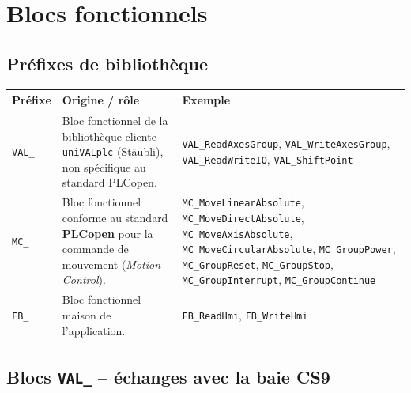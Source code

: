 \section{Blocs fonctionnels}
\label{secBlocsFonctionnels}

\subsection{Préfixes de bibliothèque}

\begin{center}
    \begin{tabular}{|p{2.6cm}|p{6.6cm}|p{5cm}|}
        \hline
        \textbf{Préfixe} & \textbf{Origine / rôle} & \textbf{Exemple} \\
        \hline
        \texttt{VAL\_} & Bloc fonctionnel de la bibliothèque cliente \texttt{uniVALplc} (Stäubli), non spécifique au standard PLCopen. & \texttt{VAL\_ReadAxesGroup}, \texttt{VAL\_WriteAxesGroup}, \texttt{VAL\_ReadWriteIO}, \texttt{VAL\_ShiftPoint} \\
        \hline
        \texttt{MC\_} & Bloc fonctionnel conforme au standard \textbf{PLCopen} pour la commande de mouvement (\emph{Motion Control}). & \texttt{MC\_MoveLinearAbsolute}, \texttt{MC\_MoveDirectAbsolute}, \texttt{MC\_MoveAxisAbsolute}, \texttt{MC\_MoveCircularAbsolute}, \texttt{MC\_GroupPower}, \texttt{MC\_GroupReset}, \texttt{MC\_GroupStop}, \texttt{MC\_GroupInterrupt}, \texttt{MC\_GroupContinue} \\
        \hline
        \texttt{FB\_} & Bloc fonctionnel maison de l'application. & \texttt{FB\_ReadHmi}, \texttt{FB\_WriteHmi} \\
        \hline
    \end{tabular}
\end{center}

\subsection{Blocs \texttt{VAL\_} -- échanges avec la baie CS9}

